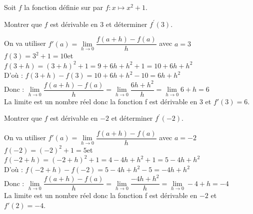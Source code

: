 \documentclass[11pt,a4paper]{article}  %
\begin{document}
\exercice{}

Soit $f$ la fonction définie sur \R par $f: x \mapsto x^2+1$.
\begin{enumMet}
	\item Montrer que $f$  est dérivable en 3 et déterminer $f^{\prime}(3)$.\\
	\begin{corrBox}
		On va utiliser $f'(a)=\lim \limits_{h \rightarrow 0} \dfrac{f(a+h)-f(a)}{h}$ avec $a=3$\\
		$f(3)=3^2+1=10$\quad \quad et\quad \quad $f(3+h)=(3+h)^2+1=9+6h+h^2+1=10+6h+h^2$\\
		D'où : $f(3+h)-f(3)=10+6h+h^2-10=6h+h^2$\\
		Donc : $\lim \limits_{h \rightarrow 0} \dfrac{f(a+h)-f(a)}{h}=\lim \limits_{h \rightarrow 0} \dfrac{6h+h^2}{h}=\lim \limits_{h \rightarrow 0} 6+h=6$\\
		La limite est un nombre réel donc la fonction f est dérivable en 3 et $f'(3)=6$.
	\end{corrBox}
	\item Montrer que $f$ est dérivable en $-2$ et déterminer $f^{\prime}(-2)$.
	\begin{corrBox}
		On va utiliser $f'(a)=\lim \limits_{h \rightarrow 0} \dfrac{f(a+h)-f(a)}{h}$ avec $a=-2$\\
		$f(-2)=(-2)^2+1=5$\quad \quad et\quad \quad $f(-2+h)=(-2+h)^2+1=4-4h+h^2+1=5-4h+h^2$\\
		D'où : $f(-2+h)-f(-2)=5-4h+h^2-5=-4h+h^2$\\
		Donc : $\lim \limits_{h \rightarrow 0} \dfrac{f(a+h)-f(a)}{h}=\lim \limits_{h \rightarrow 0} \dfrac{-4h+h^2}{h}=\lim \limits_{h \rightarrow 0} -4+h=-4$\\
		La limite est un nombre réel donc la fonction f est dérivable en $-2$ et $f'(2)=-4$.
	\end{corrBox}
\end{enumMet}

\exercice{}
\end{document}
